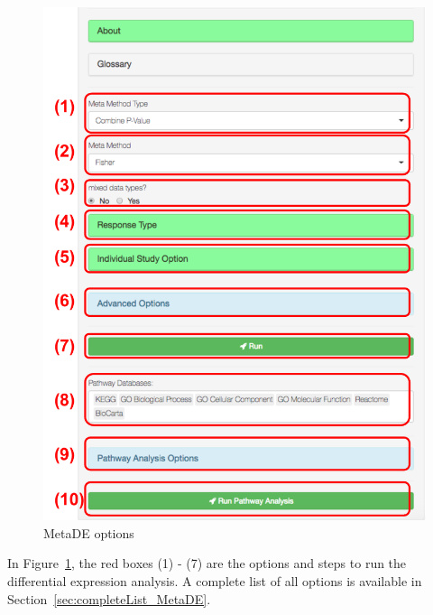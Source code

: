 \begin{figure}[H]
\begin{center}
\includegraphics[scale=0.6]{./figure/metaDE/metaDEoption.pdf}
\caption{MetaDE options}
\label{fig:MetaDEoption}
\end{center}
\end{figure}

In Figure~\ref{fig:MetaDEoption},
{\color{red} the red boxes (1) - (7)} are the options and steps to run the differential expression analysis.
A complete list of all options is available in Section~\ref{sec:completeList_MetaDE}. 

